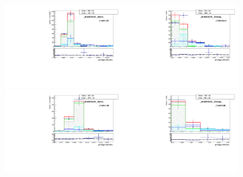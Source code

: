 \begin{figure}[htb]
  \begin{center}
   \includegraphics[width=0.45\textwidth]{../figs/figs_v11/ELECTRON_WGamma/TemplateFits/c_TEMPL_SIHIH_UNblind__phoEt35to45__Barrel__RooFit_MCclosure.pdf}\includegraphics[width=0.45\textwidth]{../figs/figs_v11/ELECTRON_WGamma/TemplateFits/c_TEMPL_SIHIH_UNblind__phoEt35to45__Endcap__RooFit_MCclosure.pdf}\\
   \includegraphics[width=0.45\textwidth]{../figs/figs_v11/ELECTRON_WGamma/TemplateFits/c_TEMPL_SIHIH_UNblind__phoEt45to55__Barrel__RooFit_MCclosure.pdf}\includegraphics[width=0.45\textwidth]{../figs/figs_v11/ELECTRON_WGamma/TemplateFits/c_TEMPL_SIHIH_UNblind__phoEt45to55__Endcap__RooFit_MCclosure.pdf}\\

\end{center}
\end{figure}
